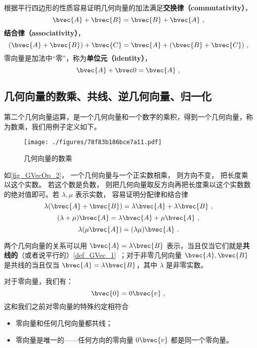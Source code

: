 根据平行四边形的性质容易证明几何向量的加法满足\textbf{交换律（commutativity）}，
\begin{equation}
\bvec{A} + \bvec{B} = \bvec{B} + \bvec{A}~,
\end{equation}
\textbf{结合律（associativity）}，
\begin{equation}
(\bvec{A} + \bvec{B}) + \bvec{C} = \bvec{A} + (\bvec{B} + \bvec{C})~,
\end{equation}
零向量是加法中“零”，称为\textbf{单位元（identity）}，
\begin{equation}
\bvec{A} + \bvec 0 = \bvec{A}~,
\end{equation}

\subsection{几何向量的数乘、共线、逆几何向量、归一化}\label{sub_GVecOp_1}
第二个几何向量运算，是一个几何向量和一个数字的乘积，得到一个几何向量，称为数乘，我们用例子定义如下。

\begin{figure}[ht]
\centering
\texttt{[image: ./figures/78f83b186bce7a11.pdf]}
\caption{几何向量的数乘} \label{fig_GVecOp_2}
\end{figure}

如\autoref{fig_GVecOp_2}， 一个几何向量与一个正实数相乘， 则方向不变， 把长度乘以这个实数。 若这个数是负数， 则把几何向量取反方向再把长度乘以这个实数数的绝对值即可。若 $\lambda, \mu$ 表示实数， 容易证明分配律和结合律
\begin{equation}
\lambda(\bvec{A} + \bvec{B}) = \lambda\bvec{A} + \lambda\bvec{B}~,
\end{equation}
\begin{equation}
(\lambda+\mu)\bvec{A} = \lambda\bvec{A} + \mu\bvec{A}~,
\end{equation}
\begin{equation}
\lambda(\mu\bvec{A}) = (\lambda\mu) \bvec{A}~.
\end{equation}

两个几何向量的关系可以用 $\bvec{A} = \lambda\bvec{B}$ 表示，当且仅当它们就是\textbf{共线的}（或者说平行的）\autoref{def_GVec_1}~；对于非零几何向量 $\bvec{A}, \bvec{B}$ 是共线的当且仅当 $\bvec{A} = \lambda\bvec{B}$，其中 $\lambda$ 是非零实数。

对于零向量，我们有：
\begin{equation}
\bvec{0} = 0 \bvec{v}~,
\end{equation}
这和我们之前对零向量的特殊约定相符合
\begin{itemize}
\item 零向量和任何几何向量都共线；
\item 零向量是唯一的——任何方向的零向量 $0 \bvec{v}$ 都是同一个零向量。
\end{itemize}

